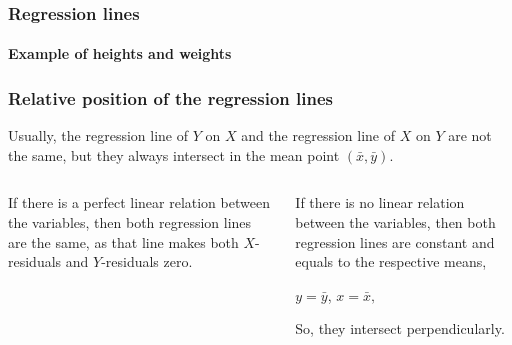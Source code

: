 \begin{frame}
\frametitle{Regression lines}
\framesubtitle{Example of heights and weights}
\begin{center}
\end{center}
\end{frame}


\begin{frame}
\frametitle{Relative position of the regression lines}
Usually, the regression line of $Y$ on $X$ and the regression line of $X$
on $Y$ are not the same, but they always intersect in the mean point $(\bar x,\bar y)$.
\medskip
\begin{columns}[t]
\begin{column}{0.48\textwidth}
If there is a perfect linear relation between the variables, then both regression lines are the same, as that line makes both $X$-residuals and $Y$-residuals zero.
\begin{center}
\end{center}
\end{column}
\begin{column}{0.48\textwidth}
If there is no linear relation between the variables, then both regression lines are constant and equals to the
respective means, 
\begin{center}
$y = \bar y$, \qquad $x = \bar x,$
\end{center}
So, they intersect perpendicularly.
\begin{center}
\end{center}
\end{column}
\end{columns}
\end{frame}



